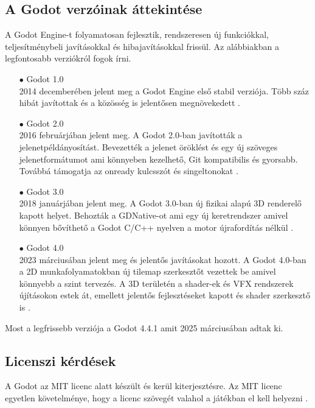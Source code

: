 \documentclass[
]{thesis-ekf}
\theoremstyle{definition}
\theoremstyle{remark}
\begin{document}
\subsection{A Godot verzóinak áttekintése}
A Godot Engine-t folyamatosan fejlesztik, rendszeresen új funkciókkal, teljesítménybeli javításokkal és hibajavításokkal frissül. Az alábbiakban a legfontosabb verziókról fogok írni.
\begin{itemize}
	\item[$\bullet$] Godot 1.0 \\ 2014 decemberében jelent meg a Godot Engine első stabil verziója. Több száz hibát javítottak és a közösség is jelentősen megnövekedett \cite{Godot1.0}.
	\item[$\bullet$] Godot 2.0 \\ 2016 februárjában jelent meg. A Godot 2.0-ban javították a jelenetpéldányosítást. Bevezették a jelenet öröklést és egy új szöveges jelenetformátumot ami könnyeben kezelhető, Git kompatibilis és gyorsabb. Továbbá támogatja az onready kulcsszót és singeltonokat \cite{Godot2.0}.
	\item[$\bullet$] Godot 3.0 \\ 2018 januárjában jelent meg. A Godot 3.0-ban új fizikai alapú 3D renderelő kapott helyet. Behozták a GDNative-ot  ami egy új keretrendszer amivel könnyen bővíthető a Godot C/C++ nyelven a motor újrafordítás nélkül \cite{Godot3.0}.
	\item [$\bullet$] Godot 4.0\\  2023 márciusában jelent meg és jelentős javításokat hozott.  A Godot 4.0-ban a 2D munkafolyamatokban új tilemap szerkesztőt vezettek be amivel könnyebb a szint tervezés. A 3D területén a shader-ek és VFX rendszerek újításokon estek át, emellett jelentős fejlesztéseket kapott és shader szerkesztő is \cite{Godot4.0}.
\end{itemize}
Most a legfrissebb verziója a Godot 4.4.1 amit 2025 márciusában adtak ki.
\subsection{Licenszi kérdések}
A Godot az MIT licenc alatt készült és kerül kiterjesztésre. Az MIT licenc egyetlen követelménye, hogy a licenc szövegét valahol a játékban el kell helyezni \cite{GodotLicenc}.
\end{document}
